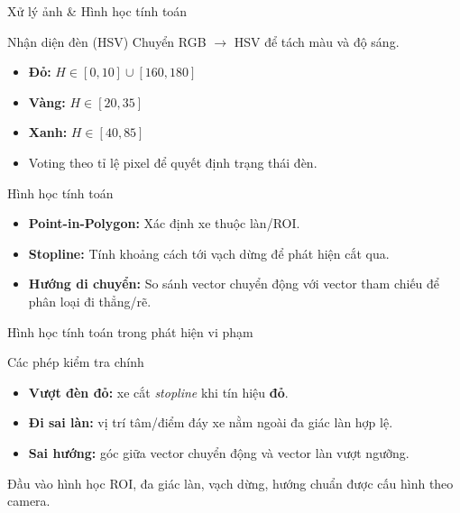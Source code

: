 \begin{frame}[allowframebreaks]{Xử lý ảnh \& Hình học tính toán}
    \begin{block}{Nhận diện đèn (HSV)}
        Chuyển RGB $\to$ HSV để tách màu và độ sáng.
        \begin{itemize}
            \item \textbf{Đỏ:} $H \in [0,10] \cup [160,180]$
            \item \textbf{Vàng:} $H \in [20,35]$
            \item \textbf{Xanh:} $H \in [40,85]$
            \item Voting theo tỉ lệ pixel để quyết định trạng thái đèn.
        \end{itemize}
    \end{block}
    \framebreak
    \begin{block}{Hình học tính toán}
        \begin{itemize}
            \item \textbf{Point-in-Polygon:} Xác định xe thuộc làn/ROI.
            \item \textbf{Stopline:} Tính khoảng cách tới vạch dừng để phát hiện cắt qua.
            \item \textbf{Hướng di chuyển:} So sánh vector chuyển động với vector tham chiếu để phân loại đi thẳng/rẽ.
        \end{itemize}
    \end{block}
\end{frame}

\begin{frame}{Hình học tính toán trong phát hiện vi phạm}
    \begin{block}{Các phép kiểm tra chính}
    \begin{itemize}
        \item \textbf{Vượt đèn đỏ:} xe cắt \emph{stopline} khi tín hiệu \textbf{đỏ}.
        \item \textbf{Đi sai làn:} vị trí tâm/điểm đáy xe nằm ngoài đa giác làn hợp lệ.
        \item \textbf{Sai hướng:} góc giữa vector chuyển động và vector làn vượt ngưỡng.
    \end{itemize}
    \end{block}
    \begin{block}{Đầu vào hình học}
        ROI, đa giác làn, vạch dừng, hướng chuẩn được cấu hình theo camera.
    \end{block}
\end{frame}
